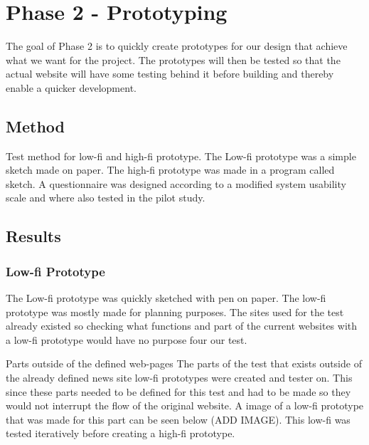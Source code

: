 
\chapter{Phase 2 - Prototyping} %

\label{Chapter5} %

The goal of Phase 2 is to quickly create prototypes for our design that achieve what we want for the project. The prototypes will then be tested so that the actual website will have some testing behind it before building and thereby enable a quicker development.

\section{Method}
Test method for low-fi and high-fi prototype. The Low-fi prototype was a simple sketch made on paper. The high-fi prototype was made in a program called sketch. A questionnaire was designed according to a modified system usability scale and where also tested in the pilot study. 


\section{Results}
\subsection{Low-fi Prototype}
The Low-fi prototype was quickly sketched with pen on paper. The low-fi prototype was mostly made for planning purposes. The sites used for the test already existed so checking what functions and part of the current websites with a low-fi prototype would have no purpose four our test.

Parts outside of the defined web-pages
The parts of the test that exists outside of the already defined news site low-fi prototypes were created and tester on. This since these parts needed to be defined for this test and had to be made so they would not interrupt the flow of the original website. A image of a low-fi prototype that was made for this part can be seen below (ADD IMAGE). This low-fi was tested iteratively before creating a high-fi prototype. 

